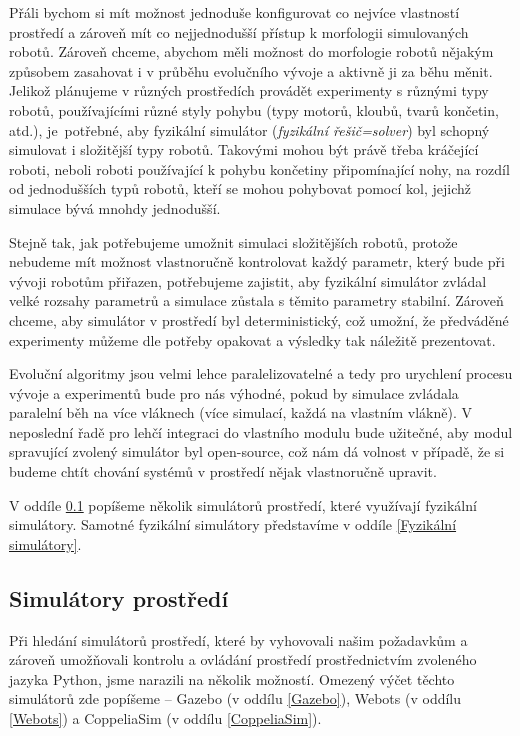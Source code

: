 Přáli bychom si mít možnost jednoduše konfigurovat co nejvíce vlastností
prostředí a zároveň mít co nejjednodušší přístup k morfologii simulovaných
robotů. Zároveň chceme, abychom měli možnost do morfologie robotů nějakým
způsobem zasahovat i v průběhu evolučního vývoje a aktivně ji za běhu měnit.
Jelikož plánujeme v různých prostředích provádět experimenty s různými typy
robotů, používajícími různé styly pohybu (typy motorů, kloubů, tvarů končetin,
atd.), je~potřebné, aby fyzikální simulátor (\emph{fyzikální řešič=solver}) byl
schopný simulovat i složitější typy robotů. Takovými mohou být právě třeba
kráčející roboti, neboli roboti používající k pohybu končetiny připomínající
nohy, na rozdíl od jednodušších typů robotů, kteří se mohou pohybovat pomocí
kol, jejichž simulace bývá mnohdy jednodušší. 

Stejně tak, jak potřebujeme umožnit simulaci složitějších robotů, protože
nebudeme mít možnost vlastnoručně kontrolovat každý parametr, který bude při
vývoji robotům přiřazen, potřebujeme zajistit, aby fyzikální simulátor zvládal
velké rozsahy parametrů a simulace zůstala s těmito parametry stabilní. Zároveň
chceme, aby simulátor v prostředí byl deterministický, což umožní, že
předváděné experimenty můžeme dle potřeby opakovat a výsledky tak náležitě
prezentovat. 

Evoluční algoritmy jsou velmi lehce paralelizovatelné a tedy pro
urychlení procesu vývoje a experimentů bude pro nás výhodné, pokud by simulace
zvládala paralelní běh na více vláknech (více simulací, každá na vlastním
vlákně). V neposlední řadě pro lehčí integraci do vlastního modulu bude
užitečné, aby modul spravující zvolený simulátor byl open-source, což nám dá
volnost v případě, že si budeme chtít chování systémů v prostředí nějak
vlastnoručně upravit.

V oddíle \ref{Simulátory prostředí} popíšeme několik simulátorů prostředí,
které využívají fyzikální simulátory. Samotné fyzikální simulátory představíme
v oddíle \ref{Fyzikální simulátory}.

\subsection{Simulátory prostředí} \label{Simulátory prostředí}

Při hledání simulátorů prostředí, které by vyhovovali našim požadavkům
a zároveň umožňovali kontrolu a ovládání prostředí prostřednictvím zvoleného jazyka
Python, jsme narazili na několik možností. Omezený výčet těchto simulátorů zde
popíšeme -- Gazebo (v oddílu \ref{Gazebo}), Webots (v oddílu \ref{Webots}) a
CoppeliaSim (v oddílu \ref{CoppeliaSim}).

